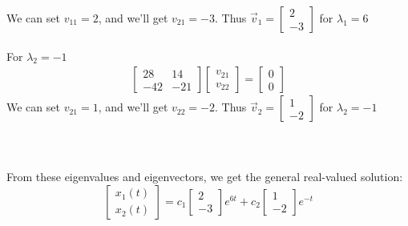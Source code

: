 \documentclass[12pt]{article}
\begin{document}
We can set $v_{11} = 2$, and we'll get $v_{21} = -3$. Thus $\vec{v}_1 = \begin{bmatrix}	2 \\ -3	\end{bmatrix}$ for $\lambda_1 = 6$
\\ \\ 
For $\lambda_2 = -1$
	\begin{align*}
		\begin{bmatrix}
			28 & 14 \\ -42 & -21
		\end{bmatrix}
		\begin{bmatrix}
			 v_{21} \\ v_{22}
		\end{bmatrix}
		= 
		\begin{bmatrix}
			0 \\ 0
		\end{bmatrix}
	\end{align*} 
We can set $v_{21} = 1$, and we'll get $v_{22} = -2$. Thus $\vec{v}_2 = \begin{bmatrix}	1 \\ -2	\end{bmatrix}$ for $\lambda_2 = -1$
\\ \\ \\ \\
From these eigenvalues and eigenvectors, we get the general real-valued solution:
	$$
	\begin{bmatrix} x_1(t) \\ x_2(t) \end{bmatrix} =
	c_1 \begin{bmatrix}	2 \\ -3	\end{bmatrix} e^{6t} +
	c_2 \begin{bmatrix}	1 \\ -2	\end{bmatrix} e^{-t}
	$$

\newpage 
\end{document}

